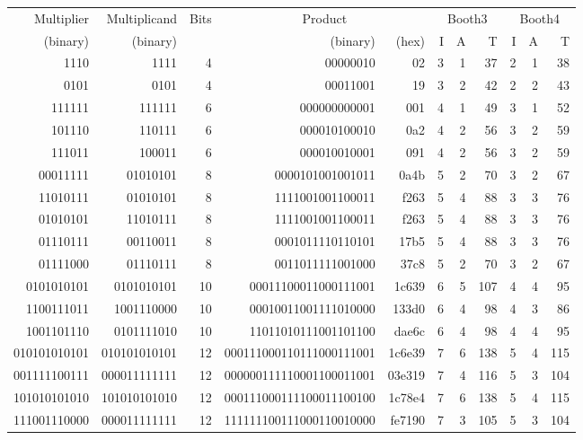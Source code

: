 \documentclass[12pt]{article}
\begin{document}
\begin{landscape}
    \vspace{12pt}
    \begin{tabular}{ |rrr|rr|rrr|rrr| }
        \hline
        Multiplier & Multiplicand & Bits & \multicolumn{2}{|c|}{Product} & \multicolumn{3}{|c|}{Booth3} & \multicolumn{3}{|c|}{Booth4}  \\
        (binary) & (binary) & & (binary) & (hex) & I & A & T & I & A & T \\
        \hline
        1110 & 1111 & 4 & 00000010 & 02 & 3 & 1 & 37 & 2 & 1 & 38 \\
        0101 & 0101 & 4 & 00011001 & 19 & 3 & 2 & 42 & 2 & 2 & 43 \\
        \hline
        111111 & 111111 & 6 & 000000000001 & 001 & 4 & 1 & 49 & 3 & 1 & 52 \\
        101110 & 110111 & 6 & 000010100010 & 0a2 & 4 & 2 & 56 & 3 & 2 & 59 \\
        111011 & 100011 & 6 & 000010010001 & 091 & 4 & 2 & 56 & 3 & 2 & 59 \\
        \hline
        00011111 & 01010101 & 8 & 0000101001001011 & 0a4b & 5 & 2 & 70 & 3 & 2 & 67 \\
        11010111 & 01010101 & 8 & 1111001001100011 & f263 & 5 & 4 & 88 & 3 & 3 & 76 \\
        01010101 & 11010111 & 8 & 1111001001100011 & f263 & 5 & 4 & 88 & 3 & 3 & 76 \\
        01110111 & 00110011 & 8 & 0001011110110101 & 17b5 & 5 & 4 & 88 & 3 & 3 & 76 \\
        01111000 & 01110111 & 8 & 0011011111001000 & 37c8 & 5 & 2 & 70 & 3 & 2 & 67 \\
        \hline
        0101010101 & 0101010101 & 10 & 00011100011000111001 & 1c639 & 6 & 5 & 107 & 4 & 4 & 95 \\
        1100111011 & 1001110000 & 10 & 00010011001111010000 & 133d0 & 6 & 4 & 98 & 4 & 3 & 86 \\
        1001101110 & 0101111010 & 10 & 11011010111001101100 & dae6c & 6 & 4 & 98 & 4 & 4 & 95 \\
        \hline
        010101010101 & 010101010101 & 12 & 000111000110111000111001 & 1c6e39 & 7 & 6 & 138 & 5 & 4 & 115 \\
        001111100111 & 000011111111 & 12 & 000000111110001100011001 & 03e319 & 7 & 4 & 116 & 5 & 3 & 104 \\
        101010101010 & 101010101010 & 12 & 000111000111100011100100 & 1c78e4 & 7 & 6 & 138 & 5 & 4 & 115 \\
        111001110000 & 000011111111 & 12 & 111111100111000110010000 & fe7190 & 7 & 3 & 105 & 5 & 3 & 104 \\
        \hline
    \end{tabular}
\end{landscape}
\end{document}
